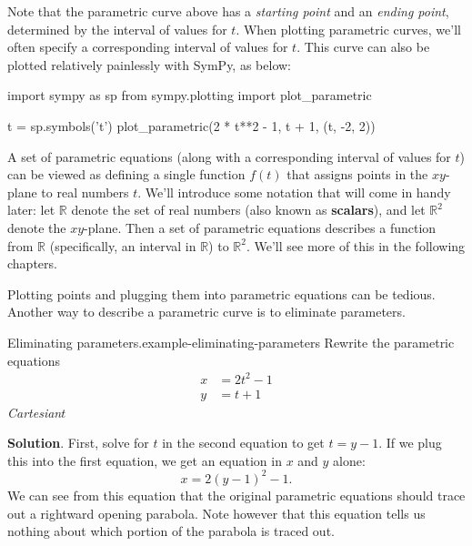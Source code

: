 \documentclass[10pt,]{book}
\newcommand{\terminology}[1]{\textbf{#1}}
\numberwithin{equation}{section}
\newcommand{\amp}{&}
\begin{document}
\hypertarget{p-990}{}%
Note that the parametric curve above has a \emph{starting point} and an \emph{ending point}, determined by the interval of values for \(t\). When plotting parametric curves, we'll often specify a corresponding interval of values for \(t\). This curve can also be plotted relatively painlessly with SymPy, as below:%
\begin{sageinput}
import sympy as sp
from sympy.plotting import plot_parametric

t = sp.symbols('t')
plot_parametric(2 * t**2 - 1, t + 1, (t, -2, 2))
\end{sageinput}
\hypertarget{p-991}{}%
A set of parametric equations (along with a corresponding interval of values for \(t\)) can be viewed as defining a single function \(f(t)\) that assigns points in the \(xy\)-plane to real numbers \(t\). We'll introduce some notation that will come in handy later: let \(\mathbb{R}\) denote the set of real numbers (also known as \terminology{scalars}), and let \(\mathbb{R}^{2}\) denote the \(xy\)-plane. Then a set of parametric equations describes a function from \(\mathbb{R}\) (specifically, an interval in \(\mathbb{R}\)) to \(\mathbb{R}^{2}\). We'll see more of this in the following chapters.%
\par
\hypertarget{p-992}{}%
Plotting points and plugging them into parametric equations can be tedious. Another way to describe a parametric curve is to eliminate parameters.%
\begin{example}{Eliminating parameters.}{example-eliminating-parameters}%
\hypertarget{p-993}{}%
Rewrite the parametric equations%
%
\begin{align*}
x \amp = 2t^{2}-1 \\
y \amp = t+1 
\end{align*}
\emph{Cartesian}\(t\)\par\smallskip%
\noindent\textbf{Solution}.\hypertarget{solution-199}{}\quad%
\hypertarget{p-994}{}%
First, solve for \(t\) in the second equation to get \(t = y-1\). If we plug this into the first equation, we get an equation in \(x\) and \(y\) alone:%
%
\begin{equation*}
x = 2(y-1)^{2}-1.
\end{equation*}
\hypertarget{p-995}{}%
We can see from this equation that the original parametric equations should trace out a rightward opening parabola. Note however that this equation tells us nothing about which portion of the parabola is traced out.%
\end{example}
\end{document}
